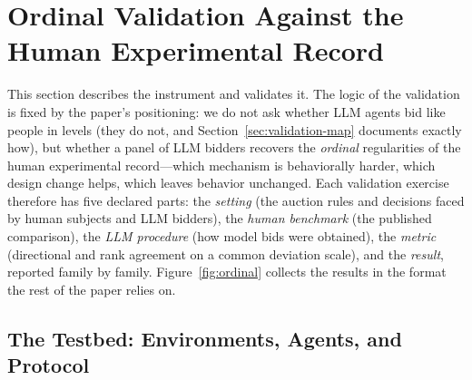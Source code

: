 
\section{Ordinal Validation Against the Human Experimental Record}\label{sec:validation}

This section describes the instrument and validates it. The logic of the validation is fixed by the paper's positioning: we do not ask whether LLM agents bid like people in levels (they do not, and Section~\ref{sec:validation-map} documents exactly how), but whether a panel of LLM bidders recovers the \emph{ordinal} regularities of the human experimental record---which mechanism is behaviorally harder, which design change helps, which leaves behavior unchanged. Each validation exercise therefore has five declared parts: the \emph{setting} (the auction rules and decisions faced by human subjects and LLM bidders), the \emph{human benchmark} (the published comparison), the \emph{LLM procedure} (how model bids were obtained), the \emph{metric} (directional and rank agreement on a common deviation scale), and the \emph{result}, reported family by family. Figure~\ref{fig:ordinal} collects the results in the format the rest of the paper relies on.

\subsection{The Testbed: Environments, Agents, and Protocol}\label{sec:design}

